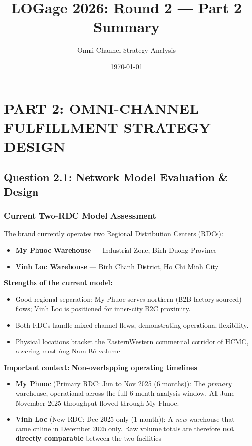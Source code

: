 \documentclass[11pt]{article}
\author{}
\date{}
\title{\textbf{LOGage 2026: Round 2 — Part 2 Summary}}
\author{Omni-Channel Strategy Analysis}
\date{\today}
\begin{document}
\maketitle
\tableofcontents
\newpage

\section{PART 2: OMNI-CHANNEL FULFILLMENT STRATEGY DESIGN}

\subsection{Question 2.1: Network Model Evaluation \& Design}

\subsubsection{Current Two-RDC Model Assessment}

The brand currently operates two Regional Distribution Centers (RDCs):
\begin{itemize}
  \item \textbf{My Phuoc Warehouse} — Industrial Zone, Binh Duong Province
  \item \textbf{Vinh Loc Warehouse} — Binh Chanh District, Ho Chi Minh City
\end{itemize}

\textbf{Strengths of the current model:}
\begin{itemize}
  \item Good regional separation: My Phuoc serves northern (B2B factory-sourced) flows; Vinh Loc is positioned for inner-city B2C proximity.
  \item Both RDCs handle mixed-channel flows, demonstrating operational flexibility.
  \item Physical locations bracket the Eastern\textendash{}Western commercial corridor of HCMC, covering most \DJ{}\^ong Nam B\^o volume.
\end{itemize}

\textbf{Important context: Non-overlapping operating timelines}
\begin{itemize}
  \item \textbf{My Phuoc} (Primary RDC: Jun to Nov 2025 (6 months)): The \textit{primary} warehouse, operational across the full 6-month analysis window. All June--November 2025 throughput flowed through My Phuoc.
  \item \textbf{Vinh Loc} (New RDC: Dec 2025 only (1 month)): A \textit{new} warehouse that came online in December 2025 only. Raw volume totals are therefore \textbf{not directly comparable} between the two facilities.
\end{itemize}
\end{document}
